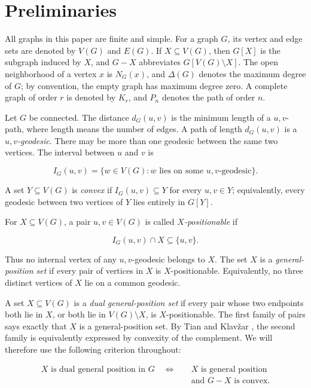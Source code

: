 \documentclass[preprint,12pt]{elsarticle}
\numberwithin{equation}{section}
\begin{document}
\section{Preliminaries}\label{sec:preliminaries}

All graphs in this paper are finite and simple. For a graph \(G\), its
vertex and edge sets are denoted by \(V(G)\) and \(E(G)\). If
\(X\subseteq V(G)\), then \(G[X]\) is the subgraph induced by \(X\), and
\(G-X\) abbreviates \(G[V(G)\setminus X]\). The open neighborhood of a
vertex \(x\) is \(N_G(x)\), and \(\Delta(G)\) denotes the maximum degree
of \(G\); by convention, the empty graph has maximum degree zero. A
complete graph of order \(r\) is denoted by \(K_r\), and
\(P_n\) denotes the path of order \(n\).

Let \(G\) be connected. The distance \(d_G(u,v)\) is the minimum length
of a \(u,v\)-path, where length means the number of edges. A path of
length \(d_G(u,v)\) is a \emph{\(u,v\)-geodesic}. There may be more than
one geodesic between the same two vertices. The interval between \(u\)
and \(v\) is

\[
I_G(u,v)=\{w\in V(G):w\text{ lies on some }u,v\text{-geodesic}\}.
\]

A set \(Y\subseteq V(G)\) is \emph{convex} if \(I_G(u,v)\subseteq Y\)
for every \(u,v\in Y\); equivalently, every geodesic between two
vertices of \(Y\) lies entirely in \(G[Y]\).

For \(X\subseteq V(G)\), a pair \(u,v\in V(G)\) is called
\emph{\(X\)-positionable} if

\[
I_G(u,v)\cap X\subseteq\{u,v\}.
\]

Thus no internal vertex of any \(u,v\)-geodesic belongs to \(X\). The
set \(X\) is a \emph{general-position set} if every pair of vertices in
\(X\) is \(X\)-positionable. Equivalently, no three distinct vertices of
\(X\) lie on a common geodesic.

A set \(X\subseteq V(G)\) is a \emph{dual general-position set} if every
pair whose two endpoints both lie in \(X\), or both lie in
\(V(G)\setminus X\), is \(X\)-positionable. The first family of pairs
says exactly that \(X\) is a general-position set. By Tian and Klav\v{z}ar
\cite[Theorem 3.1]{tian-klavzar-variety}, the second family is equivalently expressed by
convexity of the complement. We will therefore use the following
criterion throughout:

\nopagebreak[4]
\[
\begin{aligned}
X\text{ is dual general position in }G
\quad\Longleftrightarrow\quad{}
&X\text{ is general position}\\
&\text{and }G-X\text{ is convex}.
\end{aligned}
\]
\end{document}
